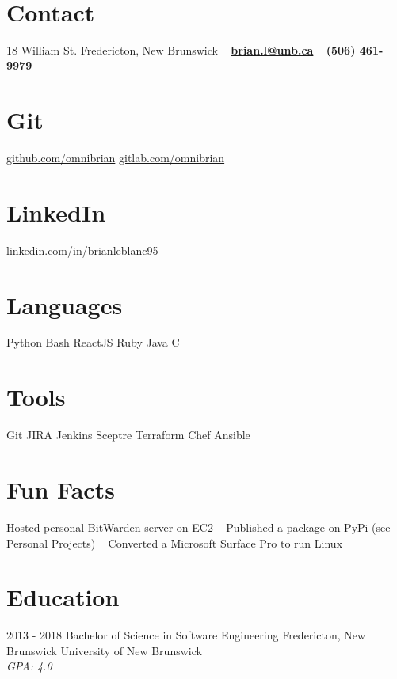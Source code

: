 \documentclass[a4paper]{resume}
\begin{document}


\begin{aside}
    ~
    ~
    ~
    ~
    ~
  \section{Contact}
    18 William St.
    Fredericton,
    New Brunswick
    ~
    \textbf{\href{mailto:brian.l@unb.ca}{brian.l@unb.ca}}
    ~
    \textbf{(506) 461-9979}
    ~
  \section{Git}
    \href{https://github.com/omnibrian}{github.com/omnibrian}
    \href{https://gitlab.com/omnibrian}{gitlab.com/omnibrian}
    ~
  \section{LinkedIn}
    \href{https://www.linkedin.com/in/brianleblanc95/}{linkedin.com/in/brianleblanc95}
    ~
  \section{Languages}
    Python
    Bash
    ReactJS
    Ruby
    Java
    C
    ~
  \section{Tools}
    Git
    JIRA
    Jenkins
    Sceptre
    Terraform
    Chef
    Ansible
    ~
  \section{Fun Facts}
    Hosted personal BitWarden server on EC2
    ~
    Published a package on PyPi (see Personal Projects)
    ~
    Converted a Microsoft Surface Pro to run Linux
    ~
\end{aside}

\section{Education}
\begin{entrylist}
  \entry
    {2013 - 2018}
    {Bachelor of Science in Software Engineering}
    {Fredericton, New Brunswick}
    {University of New Brunswick\\
    \emph{GPA: 4.0}}
\end{entrylist}
\end{document}
